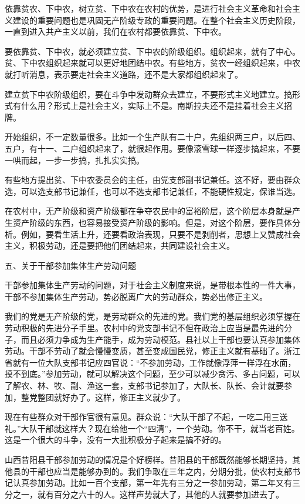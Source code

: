 依靠贫农、下中农，树立贫、下中农在农村的优势，是进行社会主义革命和社会主义建设的重要问题也是巩固无产阶级专政的重要问题。在整个社会主义历史阶段，一直到进入共产主义以前，我们在农村都要依靠贫、下中农。

要依靠贫、下中农，就必须建立贫、下中农的阶级组织。组织起来，就有了中心。贫、下中农组织起来就可以更好地团结中农。有些地方，贫农一经组织起来，中农就打听消息，表示要走社会主义道路，还不是大家都组织起来了。

建立贫下中农阶级组织，要在斗争中发动群众去建立，不要形式主义地建立。搞形式有什么用？形式上是社会主义，实际上不是。南斯拉夫还不是挂着社会主义招牌。

开始组织，不一定数量很多。比如一个生产队有二十户，先组织两三户，以后四、五户，有十一、二户组织起来了，就很起作用。要像滚雪球一样逐步搞起来，不要一哄而起，一步一步搞，扎扎实实搞。

有些地方提出贫、下中农委员会的主任，由党支部副书记兼任。这不好，要由群众选，可以选支部书记兼任，也可以不选支部书记兼任，不能硬性规定，保谁当选。

在农村中，无产阶级和资产阶级都在争夺农民中的富裕阶层，这个阶层本身就是产生资产阶级的东西，也容易接受资产阶级的影响。但是，对这个阶层，要作具体分析。例如，要看生活上升，还要看政治表现，只要不是剥削者，思想上又赞成社会主义，积极劳动，还是要把他们团结起来，共同建设社会主义。

五、关于干部参加集体生产劳动问题

干部参加集体生产劳动的问题，对于社会主义制度来说，是带根本性的一件大事，干部不参加集体生产劳动，势必脱离广大的劳动群众，势必出修正主义。

我们的党是无产阶级的党，是劳动群众的先进的党。我们党的基层组织必须掌握在劳动积极的先进分子手里。农村中的党支部书记不但在政治上应当是最先进的分子，而且必须力争成为生产能手，成为劳动模范。县社以上干部也要认真参加集体劳动。干部不劳动了就会慢慢变质，甚至变成国民党，修正主义就有基础了。浙江省就有一位大队支部书记应四官说：“不参加劳动，工作就像浮萍一样浮在水面，摸不到底。”参加劳动，就可以解决这个问题，至少可以减少贪污、多占问题，可以了解农、林、牧、副、渔这一套，支部书记参加了，大队长、队长、会计就要参加，整党整团就好办了。这样，修正主义就少了。

现在有些群众对干部作官很有意见。群众说：“大队干部了不起，一吃二用三送礼。”大队干部就这样大？现在给他一个“四清”，一个劳动。你不干，就当老百姓。这是一个很大的斗争，没有一大批积极分子起来是搞不好的。

山西昔阳县干部参加劳动的情况是个好榜样。昔阳县的干部既然能够长期坚持，其他县的干部也应当是能够办到的。我们争取在三年之内，分期分批，使农村支部书记认真参加劳动。比如一百个支部，第一年先有三分之一参加劳动，第二年又有三分之一，就有百分之六十的人。这样声势就大了，其他的人就要参加进去了。


